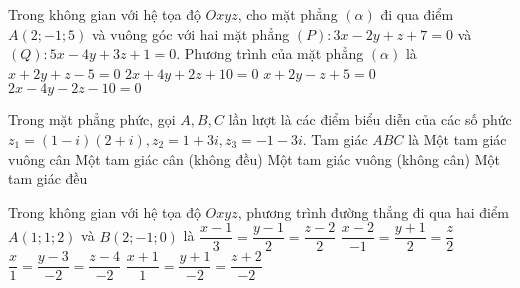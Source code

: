\begin{ex}%
Trong không gian với hệ tọa độ $Oxyz$, cho mặt phẳng $(\alpha)$ đi qua điểm $A(2; -1; 5)$ và vuông góc với hai mặt phẳng $(P): 3x - 2y + z + 7 = 0$ và $(Q): 5x - 4y + 3z + 1 = 0$. Phương trình của mặt phẳng $(\alpha)$ là 
\choice
{\True $x + 2y + z - 5 = 0$}
{$2x + 4y + 2z + 10 = 0$}
{$x + 2y - z + 5 = 0$}
{$2x - 4y - 2z - 10 = 0$}
\end{ex}





\begin{ex}%
Trong mặt phẳng phức, gọi $A, B, C$ lần lượt là các điểm biểu diễn của các số phức $z_1 = (1 - i)(2 + i), z_2 = 1 + 3i, z_3 = -1 -3i$. Tam giác $ABC$ là
\choice
{\True Một tam giác vuông cân}
{Một tam giác cân (không đều)}
{Một tam giác vuông (không cân)}
{Một tam giác đều}
\end{ex}




\begin{ex}%
Trong không gian với hệ tọa độ $Oxyz$, phương trình đường thẳng đi qua hai điểm $A(1; 1; 2)$ và $B(2; -1; 0)$ là
\choice
{$\dfrac{x - 1}{3} = \dfrac{y - 1}{2} = \dfrac{z - 2}{2}$}
{\True $\dfrac{x - 2}{-1} = \dfrac{y + 1}{2} = \dfrac{z }{2}$}
{$\dfrac{x}{1} = \dfrac{y - 3}{-2} = \dfrac{z - 4}{-2}$}
{$\dfrac{x + 1}{1} = \dfrac{y + 1}{-2} = \dfrac{z + 2}{-2}$}
\end{ex}


